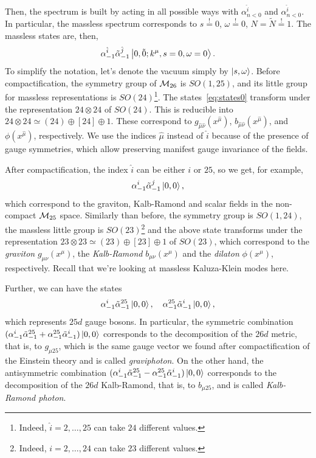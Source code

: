 Then, the spectrum is built by acting in all possible ways with $\alpha^{\hat{i}}_{n<0}$ and $\alpha^{\hat{i}}_{n<0}$. In particular, the massless spectrum corresponds to $s \overset{\mathrm{!}}{=} 0$, $\omega \overset{\mathrm{!}}{=} 0$, $N = \tilde{N} \overset{\mathrm{!}}{=} 1$. The massless states are, then, 
\begin{equation}\label{eq:states0}
    \alpha^{\hat{i}}_{-1} \tilde{\alpha}^{\hat{j}}_{-1} \ket{0,\tilde{0}; k^\mu, s = 0, \omega = 0} .
\end{equation}
To simplify the notation, let's denote the vacuum simply by $\ket{s,\omega}$. Before compactification, the symmetry group of $\mathcal{M}_{26}$ is $SO(1,25)$, and its little group for massless representations is $SO(24)$\footnote{Indeed, $\hat{i} = 2, \dots, 25$ can take $24$ different values.}. The states~\eqref{eq:states0} transform under the representation $24 \otimes 24$ of $SO(24)$. This is reducible into $24 \otimes 24 \simeq (24) \oplus [24] \oplus 1$. These correspond to $g_{\hat{\mu}\hat{\nu}}(x^{\hat{\mu}})$, $b_{\hat{\mu}\hat{\nu}}(x^{\hat{\mu}})$, and $\phi(x^{\hat{\mu}})$, respectively. We use the indices $\hat{\mu}$ instead of $\hat{i}$ because of the presence of gauge symmetries, which allow preserving manifest gauge invariance of the fields.

After compactification, the index $\hat{i}$ can be either $i$ or $25$, so we get, for example,
\begin{equation}\label{eq:eq:comp-vectors}
    \alpha^{i}_{-1} \tilde{\alpha}^{j}_{-1} \ket{0,0},
\end{equation}
which correspond to the graviton, Kalb-Ramond and scalar fields in the non-compact $\mathcal{M}_{25}$ space. Similarly than before, the symmetry group is $SO(1,24)$, the massless little group is $SO(23)$\footnote{Indeed, ${i} = 2, \dots, 24$ can take $23$ different values.} and the above state transforms under the representation $23 \otimes 23 \simeq (23) \oplus [23] \oplus 1$ of $SO(23)$, which correspond to the \emph{graviton} $g_{\mu\nu}(x^\mu)$, the \emph{Kalb-Ramond} $b_{\mu\nu}(x^\mu)$ and the \emph{dilaton} $\phi(x^\mu)$, respectively. Recall that we're looking at massless Kaluza-Klein modes here.

Further, we can have the states
\begin{equation}\label{eq:comp-vectors}
    \alpha^{i}_{-1} \tilde{\alpha}^{25}_{-1}\ket{0,0}, \quad \alpha^{25}_{-1} \tilde{\alpha}^{i}_{-1} \ket{0,0},
\end{equation}
which represents $25d$ gauge bosons. In particular, the symmetric combination $(\alpha^{i}_{-1} \tilde{\alpha}^{25}_{-1}+ \alpha^{25}_{-1} \tilde{\alpha}^{i}_{-1}) \ket{0,0}$ corresponds to the decomposition of the $26d$ metric, that is, to $g_{\mu 25}$, which is the same gauge vector we found after compactification of the Einstein theory and is called \emph{graviphoton}. On the other hand, the antisymmetric combination $(\alpha^{i}_{-1} \tilde{\alpha}^{25}_{-1} - \alpha^{25}_{-1} \tilde{\alpha}^{i}_{-1}) \ket{0,0}$ corresponds to the decomposition of the $26d$ Kalb-Ramond, that is, to $b_{\mu 25}$, and is called \emph{Kalb-Ramond photon}.

